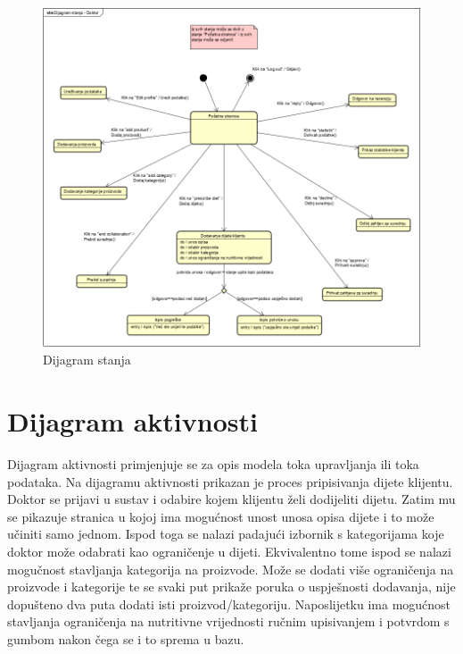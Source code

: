		\begin{figure}
			\centering
			\includegraphics[scale=0.8]{dijagrami/DijagramStanjaDobar.PNG}
			\caption{Dijagram stanja}
		\end{figure}
		\eject 
		
		
		
		
		
		
		\section{Dijagram aktivnosti}
		
		
		Dijagram aktivnosti primjenjuje se za opis modela toka upravljanja ili toka podataka. Na dijagramu aktivnosti prikazan je proces pripisivanja dijete klijentu. Doktor se prijavi u sustav i odabire kojem klijentu želi dodijeliti dijetu. Zatim mu se pikazuje stranica u kojoj ima mogućnost unost unosa opisa dijete i to može učiniti samo jednom. Ispod toga se nalazi padajući izbornik s kategorijama koje doktor može odabrati kao ograničenje u dijeti. Ekvivalentno tome ispod se nalazi mogučnost stavljanja kategorija na proizvode. Može se dodati više ograničenja na proizvode i kategorije te se svaki put prikaže poruka o uspješnosti dodavanja, nije dopušteno dva puta dodati isti proizvod/kategoriju. Naposlijetku ima mogućnost stavljanja ograničenja na nutritivne vrijednosti ručnim upisivanjem i potvrdom s gumbom nakon čega se i to sprema u bazu.  
		
